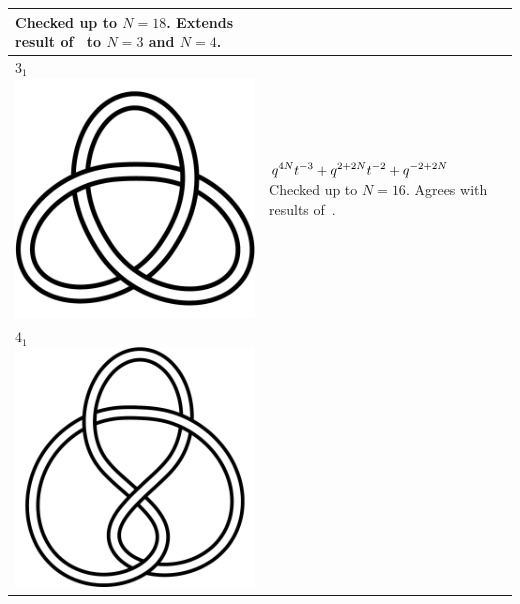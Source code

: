 \documentclass{compositio}
\theoremstyle{definition}
\numberwithin{equation}{section}
\begin{document}
{\begin{longtable}{p{}|p{}}
Checked up to $N=18$. Extends result of~\cite{r0508510} to $N=3$ and $N=4$. 
\\
\hline
$3_{1}$ 
\includegraphics[scale=0.07,angle=0]{knot3_1.pdf} 
& 
$
\displaystyle{%
q^{4N} t^{-3} + q^{2 + 2N} t^{-2} + q^{-2 + 2N}
}
$
\newline\newline\newline\newline
Checked up to $N=16$. Agrees with results of~\cite{r0508510, r0607544}. 
\\
\hline
$4_{1}$ 
\includegraphics[scale=0.07,angle=0]{knot4_1.pdf} 

\end{longtable}}
\end{document}
